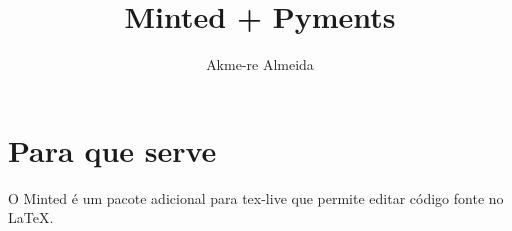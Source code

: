 \documentclass[12pt,twoside,a4paper]{article}
\title{Minted + Pyments}
\author{Akme-re Almeida}
\begin{document}
\maketitle

\section{Para que serve}
	O Minted é um pacote adicional para tex-live que permite editar código fonte no \LaTeX.
\
\end{document}
